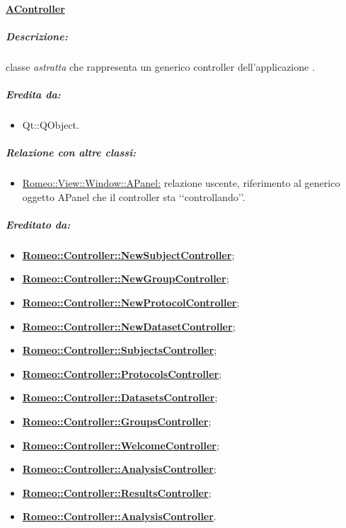 	\paragraph{\underline{AController}}
	\label{controller_a}
		\subparagraph{Descrizione:} classe \emph{astratta} che rappresenta un generico controller dell'applicazione \project{}.
		\subparagraph{Eredita  da:}
			\begin{itemize}
				\item Qt::QObject.
			\end{itemize}
		\subparagraph{Relazione con altre classi:}
			\begin{itemize}
				\item \hyperref[ab_panel]{Romeo::View::Window::APanel:} relazione uscente, riferimento al generico oggetto APanel che il controller sta \lq{}\lq{}controllando\rq{}\rq{}.
			\end{itemize}
		
		\subparagraph{Ereditato da:}
		\begin{itemize}
			\item \textbf{\hyperref[controller_ns]{Romeo::Controller::NewSubjectController}};
			\item \textbf{\hyperref[controller_ngs]{Romeo::Controller::NewGroupController}};
			\item \textbf{\hyperref[controller_np]{Romeo::Controller::NewProtocolController}};
			\item \textbf{\hyperref[controller_nd]{Romeo::Controller::NewDatasetController}};
			\item \textbf{\hyperref[controller_ss]{Romeo::Controller::SubjectsController}};
			\item \textbf{\hyperref[controller_sp]{Romeo::Controller::ProtocolsController}};
			\item \textbf{\hyperref[controller_sd]{Romeo::Controller::DatasetsController}};
			\item \textbf{\hyperref[controller_sg]{Romeo::Controller::GroupsController}};
			\item \textbf{\hyperref[controller_wp]{Romeo::Controller::WelcomeController}};
			\item \textbf{\hyperref[controller_sa]{Romeo::Controller::AnalysisController}};
			\item \textbf{\hyperref[controller_vr]{Romeo::Controller::ResultsController}};
			\item \textbf{\hyperref[controller_ac]{Romeo::Controller::AnalysisController}}.
		\end{itemize}
		


